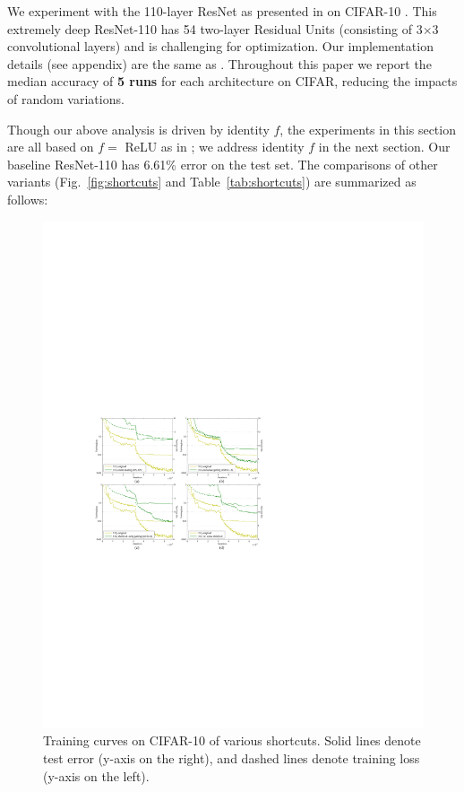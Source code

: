 \documentclass[runningheads]{llncs}
\begin{document}
We experiment with the 110-layer ResNet as presented in \cite{He2016} on CIFAR-10 \cite{Krizhevsky2009}. This extremely deep ResNet-110 has 54 two-layer Residual Units (consisting of 3$\times$3 convolutional layers) and is challenging for optimization.
Our implementation details (see appendix) are the same as \cite{He2016}. Throughout this paper we report the median accuracy of \textbf{5 runs} for each architecture on CIFAR, reducing the impacts of random variations.

Though our above analysis is driven by identity $f$, the experiments in this section are all based on $f=$ ReLU as in \cite{He2016}; we address identity $f$ in the next section.
Our baseline ResNet-110 has 6.61\% error on the test set.
The comparisons of other variants (Fig.~\ref{fig:shortcuts} and Table~\ref{tab:shortcuts}) are summarized as follows:

\begin{figure}[t]
\centering
\includegraphics[width=0.99\linewidth]{eps/curves_shortcuts}
\caption{Training curves on CIFAR-10 of various shortcuts. Solid lines denote test error (y-axis on the right), and dashed lines denote training loss (y-axis on the left).
}
\label{fig:curves_shortcuts}
\end{figure}
\end{document}
